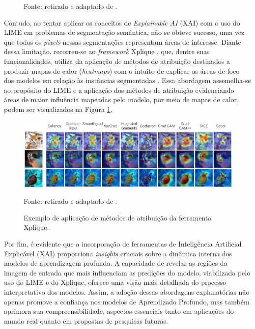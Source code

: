 \begin{figure}[H]
    Fonte: retirado e adaptado de \cite{Ribeiro2016WhyClassifier}.
\end{figure}

Contudo, ao tentar aplicar os conceitos de \textit{Explainable AI} (XAI) com o uso do LIME em problemas de segmentação semântica, não se obteve sucesso, uma vez que todos os \textit{pixels} nessas segmentações representam áreas de interesse. Diante dessa limitação, recorreu-se ao \textit{framework} Xplique \citep{Fel2022}, que, dentre suas funcionalidades, utiliza da aplicação de métodos de atribuição destinados a produzir mapas de calor (\textit{heatmaps}) com o intuito de explicar as áreas de foco dos modelos em relação às instâncias segmentadas \citep{Fel2022}. Essa abordagem assemelha-se ao propósito do LIME e a aplicação dos métodos de atribuição evidenciando áreas de maior influência mapeadas pelo modelo, por meio de mapas de calor, podem ser visualizados na Figura \ref{project:fig:explain:xplique}.

\begin{figure}[H]
    \centering
    \caption{Exemplo de aplicação de métodos de atribuição da ferramenta Xplique.}
    \includegraphics[width=1\textwidth]{recursos/imagens/project/xplique.png}
    \label{project:fig:explain:xplique}

    Fonte: retirado e adaptado de \cite{Fel2022}.
\end{figure}

Por fim, é evidente que a incorporação de ferramentas de Inteligência Artificial Explicável (XAI) proporciona \textit{insights} cruciais sobre a dinâmica interna dos modelos de aprendizagem profunda. A capacidade de revelar as regiões da imagem de entrada que mais influenciam as predições do modelo, viabilizada pelo uso do LIME e do Xplique, oferece uma visão mais detalhada do processo interpretativo dos modelos. Assim, a adoção dessas abordagens explanatórias não apenas promove a confiança nos modelos de Aprendizado Profundo, mas também aprimora sua compreensibilidade, aspectos essenciais tanto em aplicações do mundo real quanto em propostas de pesquisas futuras.

